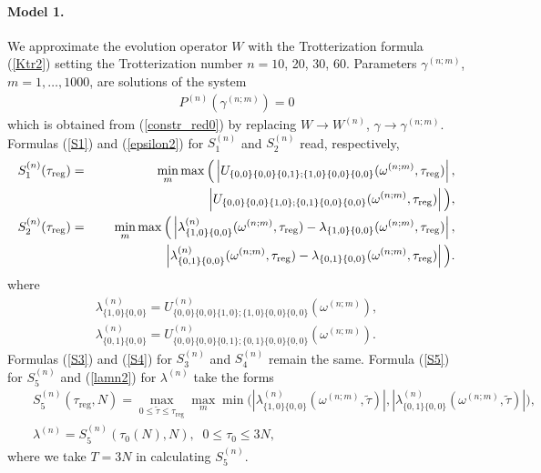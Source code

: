 \documentclass[pra,preprint,showpacs]{revtex4-1}
\begin{document}
{{\paragraph{Model 1.}
\label{Section:Model1}
We approximate the evolution operator $W$ with the Trotterization formula (\ref{Ktr2}) setting the  Trotterization number $n=10$, 20, 30, 60.
Parameters $\gamma^{(n;m)}$, $m=1,\dots,1000$, are  solutions of the system
\begin{eqnarray}\label{constr_red_6_Tr}
P^{(n)}(\gamma^{(n;m)}) =0
\end{eqnarray}
which is obtained from (\ref{constr_red0}) by replacing $W \to W^{(n)}$, $\gamma \to \gamma^{(n;m)}$.
Formulas (\ref{S1}) and (\ref{epsilon2}) for $S_1^{(n)}$ and $S_2^{(n)}$ read, respectively,
\begin{eqnarray}\label{Tr_S1}
S_1^{(n)}(\tau_{\mathrm{reg}}) &=& \min_m \max\Big(\left|U_{\{0,0\}\{0,0\}\{0,1\};\{1,0\}\{0,0\}\{0,0\}}(\omega^{(n;m)},\tau_{\mathrm{reg}})\right|, \\\nonumber
&&\hspace{1.9cm}
\left|U_{\{0,0\}\{0,0\}\{1,0\};\{0,1\}\{0,0\}\{0,0\}}(\omega^{(n;m)},\tau_{\mathrm{reg}})\right|\Big),\\\label{Tr_S2}
S_2^{(n)}(\tau_{\mathrm{reg}}) &=&
\min_m \max\Big(\left|\lambda^{(n)}_{\{1,0\}\{0,0\}}(\omega^{(n;m)},\tau_{\mathrm{reg}}) - \lambda_{\{1,0\}\{0,0\}}(\omega^{(n;m)},\tau_{\mathrm{reg}})\right|,\\\nonumber
&&\hspace{1.9cm}
\left|\lambda^{(n)}_{\{0,1\}\{0,0\}}(\omega^{(n;m)},\tau_{\mathrm{reg}}) - \lambda_{\{0,1\}\{0,0\}}(\omega^{(n;m)},\tau_{\mathrm{reg}})\right|\Big).
\end{eqnarray}
where
\begin{eqnarray}\label{lam_num2}
\lambda^{(n)}_{\{1,0\}\{0,0\}} = U^{(n)}_{\{0,0\}\{0,0\}\{1,0\};\{1,0\}\{0,0\}\{0,0\}}(\omega^{(n;m)}),\\\nonumber
\lambda^{(n)}_{\{0,1\}\{0,0\}} = U^{(n)}_{\{0,0\}\{0,0\}\{0,1\};\{0,1\}\{0,0\}\{0,0\}}(\omega^{(n;m)}).
\end{eqnarray}
Formulas (\ref{S3}) and (\ref{S4}) for $S_3^{(n)}$ and  $S_4^{(n)}$ remain the same.
Formula (\ref{S5}) for $S^{(n)}_5$ and (\ref{lamn2}) for $\lambda^{(n)}$ take the forms
\begin{eqnarray}\label{Tr_S5}
&&
S^{(n)}_5(\tau_{\mathrm{reg}},N)=\max_{0\le\tilde\tau\le\tau_{\mathrm{reg}}}\max_m \min\Big(\left|\lambda^{(n)}_{\{1,0\}\{0,0\}}(\omega^{(n;m)},\tilde \tau)\right|,
\left|\lambda^{(n)}_{\{0,1\}\{0,0\}}(\omega^{(n;m)},\tilde \tau)\right|\Big),\\\label{lamn3}
&&
\lambda^{(n)} = S^{(n)}_5(\tau_0(N),N),\;\; 0\le\tau_0\le 3 N,
\end{eqnarray}
where we take $T=3 N$ in calculating $S^{(n)}_5$.

}}
\end{document}
